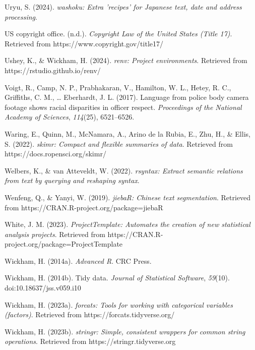 \documentclass[
  letterpaper,
  krantz1]{latex/krantz-mod}
\newlength{\cslhangindent}
\newenvironment{CSLReferences}[2] %
 {\begin{list}{}{%
  \setlength{\itemindent}{0pt}
  \setlength{\leftmargin}{0pt}
  \setlength{\parsep}{0pt}
  \ifodd #1
   \setlength{\leftmargin}{\cslhangindent}
   \setlength{\itemindent}{-1\cslhangindent}
  \fi
  \setlength{\itemsep}{#2\baselineskip}}}
 {\end{list}}
\theoremstyle{definition}
\theoremstyle{definition}
\theoremstyle{remark}
\begin{document}
\begin{CSLReferences}{1}{0}
Uryu, S. (2024). \emph{{washoku}: Extra 'recipes' for {J}apanese text,
date and address processing}.

{US} copyright office. (n.d.). \emph{Copyright Law of the United States
(Title 17)}. Retrieved from https://www.copyright.gov/title17/

Ushey, K., \& Wickham, H. (2024). \emph{{renv}: Project environments}.
Retrieved from https://rstudio.github.io/renv/

Voigt, R., Camp, N. P., Prabhakaran, V., Hamilton, W. L., Hetey, R. C.,
Griffiths, C. M., \ldots{} Eberhardt, J. L. (2017). Language from police
body camera footage shows racial disparities in officer respect.
\emph{Proceedings of the National Academy of Sciences}, \emph{114}(25),
6521--6526.

Waring, E., Quinn, M., McNamara, A., Arino de la Rubia, E., Zhu, H., \&
Ellis, S. (2022). \emph{{skimr}: Compact and flexible summaries of
data}. Retrieved from https://docs.ropensci.org/skimr/

Welbers, K., \& van Atteveldt, W. (2022). \emph{{rsyntax}: Extract
semantic relations from text by querying and reshaping syntax}.

Wenfeng, Q., \& Yanyi, W. (2019). \emph{{jiebaR}: {Chinese} text
segmentation}. Retrieved from https://CRAN.R-project.org/package=jiebaR

White, J. M. (2023). \emph{{ProjectTemplate}: Automates the creation of
new statistical analysis projects}. Retrieved from
https://CRAN.R-project.org/package=ProjectTemplate

Wickham, H. (2014a). \emph{Advanced {R}}. CRC Press.

Wickham, H. (2014b). Tidy data. \emph{Journal of Statistical Software},
\emph{59}(10). doi:10.18637/jss.v059.i10

Wickham, H. (2023a). \emph{{forcats}: Tools for working with categorical
variables (factors)}. Retrieved from https://forcats.tidyverse.org/

Wickham, H. (2023b). \emph{{stringr}: Simple, consistent wrappers for
common string operations}. Retrieved from https://stringr.tidyverse.org


\end{CSLReferences}
\end{document}

